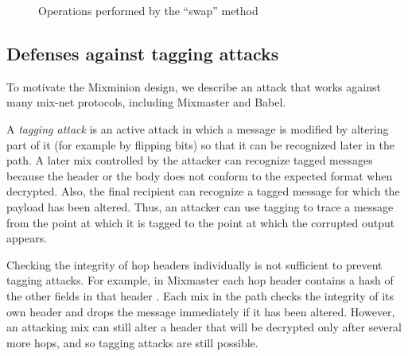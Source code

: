 \documentclass[final,inpress,inline]{ieee}
\begin{document}
\begin{figure}
\begin{center}
\caption{Operations performed by the ``swap'' method} 
\end{center}
\end{figure}

\subsection{Defenses against tagging attacks}
\label{subsec:tagging-attacks}
\label{subsec:tagging-defenses}

To motivate the Mixminion design, we describe an attack
that works against many mix-net protocols, including Mixmaster and Babel.

A {\em tagging attack} is an active attack in which a message is
modified by altering part of it (for example by flipping bits) so
that it can be recognized later in the path.  A later mix controlled by
the attacker can recognize tagged messages because the header or the
body does
not conform to the expected format when decrypted.  Also, the final
recipient can recognize a tagged message for which the payload has
been altered.  Thus, an attacker can use tagging to trace a message from the
point at which it is tagged to the point at which the corrupted output
appears. 

Checking the integrity of hop headers individually is not
sufficient to prevent tagging attacks.  For example, in Mixmaster
each hop header contains a hash of the other fields in that header
\cite{mixmaster-spec}.
Each mix in the path checks the integrity of its own header and drops
the message immediately if it has been altered.  However, 
an attacking mix can still alter a header that will be decrypted
only after several more hops, and so tagging attacks are still possible.
\end{document}
